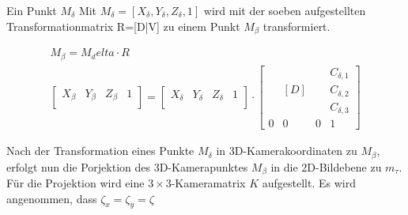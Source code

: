 Ein Punkt $M_\delta$ Mit $M_\delta=[X_\delta,Y_\delta,Z_\delta,1]$ wird mit der soeben aufgestellten Transformationmatrix R=[D|V] zu einem Punkt $M_\beta$ transformiert.

\begin{gather}
M_\beta = M_delta \cdot R\\
\begin{bmatrix}
X_\beta& Y_\beta& Z_\beta&1\\
\end{bmatrix} = 
\begin{bmatrix}
X_\delta& Y_\delta& Z_\delta&1\\
\end{bmatrix} \cdot
\begin{bmatrix}
	&  &  &C_{\delta,1} \\
	&  [D]&  &C_{\delta,2} \\ 
	&  &  &C_{\delta,3} \\
	0&0&0 & 1
\end{bmatrix}	
\end{gather}


Nach der Transformation eines Punkte $M_\delta$ in 3D-Kamerakoordinaten zu $M_\beta$, erfolgt nun die Porjektion des 3D-Kamerapunktes $M_\beta$ in die 2D-Bildebene zu $m_\tau$. Für die Projektion wird eine $3 \times 3$-Kameramatrix $K$ aufgestellt.  Es wird angenommen, dass $\zeta_x = \zeta_y =\zeta$

